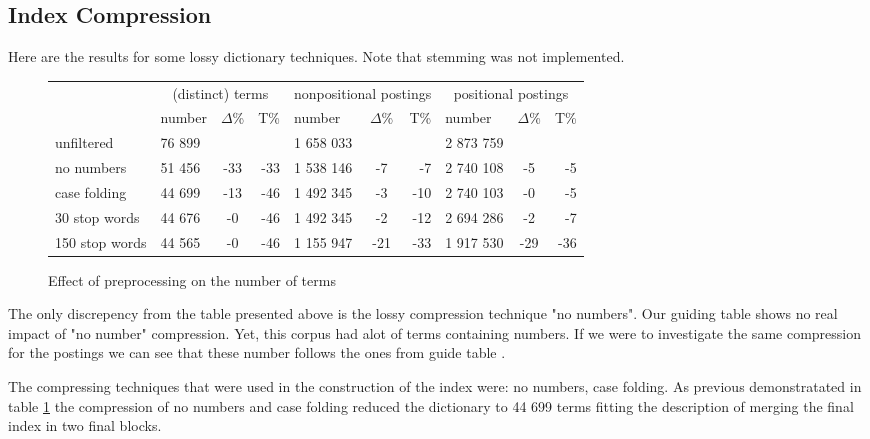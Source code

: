 \subsection{Index Compression}

\par Here are the results for some lossy dictionary techniques. Note that stemming was not implemented.

\begin{figure}[!htb]
    \centering
        \begin{tabular}{ l || l | c | r || l | c | r || l | c | r ||}
            & \multicolumn{3}{|c||}{(distinct) terms} & \multicolumn{3}{c||}{nonpositional postings} & \multicolumn{3}{c||}{positional postings} \\
            & number & $\Delta$\% & T\% & number & $\Delta$\% & T\% & number & $\Delta$\% & T\% \\ \hline
            \hline
            unfiltered & 76 899 &  & & 1 658 033 & & & 2 873 759 & & \\ \hline
            no numbers & 51 456 & -33 & -33 & 1 538 146 & -7 & -7 & 2 740 108 & -5 & -5 \\ \hline
            case folding & 44 699 & -13 & -46 & 1 492 345 & -3 & -10 & 2 740 103 & -0 & -5 \\ \hline
            30 stop words & 44 676 & -0 & -46 & 1 492 345 & -2 & -12 & 2 694 286 & -2 & -7 \\ \hline
            150 stop words & 44 565 & -0 & -46 & 1 155 947 & -21 & -33 & 1 917 530 & -29 & -36 \\ \hline
            \hline
        \end{tabular}
    \caption{Effect of preprocessing on the number of terms}
    \label{my-compression-table}
\end{figure}

\par The only discrepency from the table presented above is the lossy compression technique "no numbers". Our guiding table shows no real impact of "no number" compression. Yet, this corpus had alot of terms containing numbers. If we were to investigate the same compression for the postings we can see that these number follows the ones from guide table \cite{compression-table}.

\par The compressing techniques that were used in the construction of the index were: no numbers, case folding. As previous demonstratated in table \ref{my-compression-table} the compression of no numbers and case folding reduced the dictionary to 44 699 terms fitting the description of merging the final index in two final blocks.

